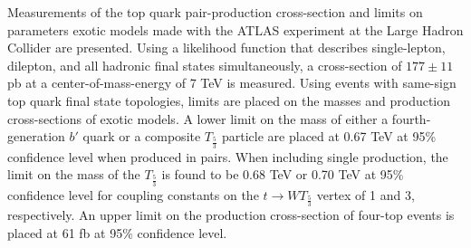 %

Measurements of the top quark pair-production cross-section and limits on parameters exotic models made with the ATLAS experiment at the Large Hadron Collider are presented.
Using a likelihood function that describes single-lepton, dilepton, and all hadronic final states simultaneously, a cross-section of $177 \pm 11$ pb at a center-of-mass-energy of 7 TeV is measured.
Using events with same-sign top quark final state topologies, limits are placed on the masses and production cross-sections of exotic models.
A lower limit on the mass of either a fourth-generation $b'$ quark or a composite $T_{\frac{5}{3}}$ particle are placed at 0.67 TeV at 95\% confidence level when produced in pairs.
When including single production, the limit on the mass of the $T_{\frac{5}{3}}$ is found to be 0.68 TeV or 0.70 TeV at 95\% confidence level for coupling constants on the $t \rightarrow WT_{\frac{5}{3}}$ vertex of 1 and 3, respectively.
An upper limit on the production cross-section of four-top events is placed at 61 fb at 95\% confidence level.



